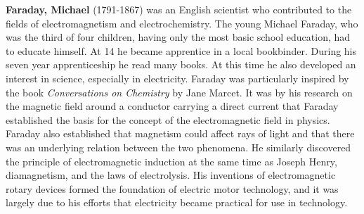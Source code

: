 \textbf{Faraday, Michael} (1791-1867) was an English scientist who contributed to the fields of electromagnetism and electrochemistry. The young Michael Faraday, who was the third of four children, having only the most basic school education, had to educate himself. At 14 he became apprentice in a local bookbinder. During his seven year apprenticeship he read many books. At this time he also developed an interest in science, especially in electricity. Faraday was particularly inspired by the book \textit{Conversations on Chemistry} by Jane Marcet. It was by his research on the magnetic field around a conductor carrying a direct current that Faraday established the basis for the concept of the electromagnetic field in physics. Faraday also established that magnetism could affect rays of light and that there was an underlying relation between the two phenomena. He similarly discovered the principle of electromagnetic induction at the same time as Joseph Henry, diamagnetism, and the laws of electrolysis. His inventions of electromagnetic rotary devices formed the foundation of electric motor technology, and it was largely due to his efforts that electricity became practical for use in technology.

